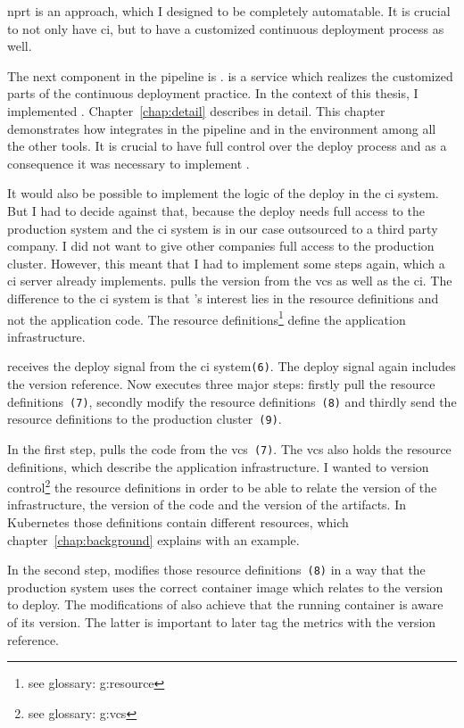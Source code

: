 \gls{nprt} is an approach, which I designed to be completely automatable. It is crucial to
not only have \gls{ci}, but to have a customized continuous deployment process as well.

The next component in the pipeline is \deployer. \deployer is a service which realizes
the customized parts of the continuous deployment practice. In the context of this thesis,
I implemented \deployer. Chapter~\ref{chap:detail} describes \deployer in detail. This
chapter demonstrates how \deployer integrates in the pipeline and in the environment among
all the other tools. It is crucial to have full control over the deploy process and as a
consequence it was necessary to implement \deployer.

It would also be possible to implement the logic of the deploy in the \gls{ci} system. But
I had to decide against that, because the deploy needs full access to the production
system and the \gls{ci} system is in our case outsourced to a third party company. I did
not want to give other companies full access to the production cluster. However, this
meant that I had to implement some steps again, which a \gls{ci} server already
implements. \deployer pulls the version from the \gls{vcs} as well as the \gls{ci}. The
difference to the \gls{ci} system is that \deployer's interest lies in the resource
definitions and not the application code. The resource definitions\footnote{see glossary:
  \gls{g:resource}} define the application infrastructure.

\deployer receives the deploy signal from the \gls{ci} system\texttt{(6)}. The deploy
signal again includes the version reference. Now \deployer executes three major steps:
firstly pull the resource definitions~\texttt{(7)}, secondly modify the resource
definitions~\texttt{(8)} and thirdly send the resource definitions to the production
cluster~\texttt{(9)}.

In the first step, \deployer pulls the code from the \gls{vcs}~\texttt{(7)}. The \gls{vcs}
also holds the resource definitions, which describe the application infrastructure. I
wanted to version control\footnote{see glossary: \gls{g:vcs}} the resource definitions in
order to be able to relate the version of the infrastructure, the version of the code and
the version of the artifacts. In Kubernetes those definitions contain different resources,
which chapter~\ref{chap:background} explains with an example.

In the second step, \deployer modifies those resource definitions~\texttt{(8)} in a way
that the production system uses the correct container image which relates to the version
to deploy. The modifications of \deployer also achieve that the running container is aware
of its version. The latter is important to later tag the metrics with the version
reference.

